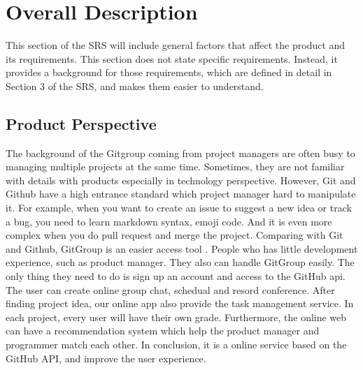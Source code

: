 \documentclass[12pt,a4paper]{report}
\begin{document}
\chapter{Overall Description}
This section of the SRS will include general factors that affect the product and its requirements. This section does not state specific requirements. Instead, it provides a background for those requirements, which are defined in detail in Section 3 of the SRS, and makes them easier to understand. 
\section{Product Perspective}
The background of the Gitgroup coming from project managers are often busy to managing multiple projects at the same time. Sometimes, they are not familiar with details with products especially in technology perspective. However, Git and Github have a high entrance standard which project manager hard to manipulate it. For example, when you want to create an issue to suggest a new idea or track a bug, you need to learn markdown syntax, emoji code. And it is even more complex when you do pull request and merge the project. Comparing with Git and Github,   GitGroup is an easier access tool . People who has little development experience, such as product manager. They also can handle GitGroup easily. The only thing they need to do is sign up an account and access to the GitHub api. The user can create online group chat, schedual and resord conference. After finding project idea, our online app also provide the task management service. In each project, every user will have their own grade. Furthermore, the online web can have a recommendation system which help the product manager and programmer match each other. In conclusion, it is a online service based on the GitHub API, and improve the user experience. 
\end{document}
